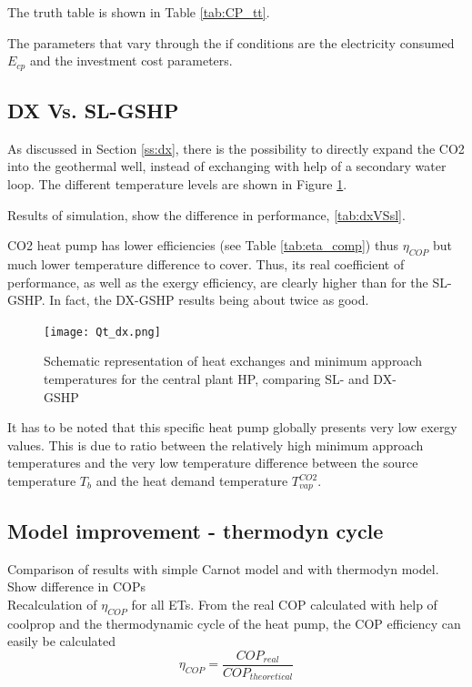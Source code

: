 \documentclass{article}
\begin{document}
The truth table is shown in Table \ref{tab:CP_tt}.


The parameters that vary through the if conditions are the electricity consumed $E_{cp}$ and the investment cost parameters. 

\subsection{DX Vs. SL-GSHP}
As discussed in Section \ref{ss:dx}, there is the possibility to directly expand the CO2 into the geothermal well, instead of exchanging with help of a secondary water loop. The different temperature levels are shown in Figure \ref{fig:Qt_dx}. 

Results of simulation, show the difference in performance, \ref{tab:dxVSsl}.



CO2 heat pump has lower efficiencies (see Table \ref{tab:eta_comp}) thus $\eta_{COP}$ but much lower temperature difference to cover. Thus, its real coefficient of performance, as well as the exergy efficiency, are clearly higher than for the SL-GSHP. In fact, the DX-GSHP results being about twice as good.

\begin{figure}[htp]
	\centering
	\texttt{[image: Qt\_dx.png]}
	\caption{Schematic representation of heat exchanges and minimum approach temperatures for the central plant HP, comparing SL- and DX-GSHP}
	\label{fig:Qt_dx}
\end{figure}

It has to be noted that this specific heat pump globally presents very low  exergy values. This is due to ratio between the relatively high minimum approach temperatures and the very low temperature difference between the source temperature $T_{b}$ and the heat demand temperature $T_{vap}^{CO2}$.

\subsection{Model improvement - thermodyn cycle}

Comparison of results with simple Carnot model and with thermodyn model. Show difference in COPs\\

Recalculation of $\eta_{COP}$ for all ETs. From the real COP calculated with help of coolprop and the thermodynamic cycle of the heat pump, the COP efficiency can easily be calculated
\begin{equation}
\eta_{COP} = \frac{COP_{real}}{COP_{theoretical}}
\end{equation}
\end{document}
